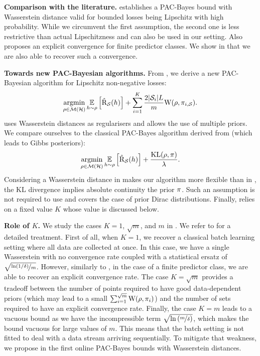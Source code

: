 \documentclass{article}
\begin{document}
\textbf{Comparison with the literature.} \cite[][Theorem 11]{amit2022integral} establishes a PAC-Bayes bound with Wasserstein distance valid for bounded losses being Lipschitz with high probability. While we circumvent the first assumption, the second one is less restrictive than actual Lipschitzness and can also be used in our setting. Also \cite[Theorem 12]{amit2022integral} proposes an explicit convergence for finite predictor classes. We show in  that we are also able to recover such a convergence. 

\textbf{Towards new PAC-Bayesian algorithms.} From , we derive a new PAC-Bayesian algorithm for Lipschitz non-negative losses:
\begin{equation}
    \label{eq:batch-alg}
    \argmin_{\Q\in\Mcal(\H)} \EE_{h\sim \Q}\left[\Riskhat_{\S}(h)\right] + \sum_{i=1}^{K} \frac{2|\S_i|L}{m} \W(\Q, \P_{i,\S}).
\end{equation}
 uses Wasserstein distances as regularisers and allows the use of multiple priors. 
We compare ourselves to the classical PAC-Bayes algorithm derived from \cite[][Theorem 1.2.6]{catoni2007pac} (which leads to Gibbs posteriors):
\begin{equation}
    \label{eq:catoni-alg}
    \argmin_{\Q\in\Mcal(\H)} \EE_{h\sim \Q}\left[\Riskhat_{\S}(h)\right] +  \frac{\operatorname{KL}(\Q,\P)}{\lambda}.
\end{equation}
Considering a Wasserstein distance in  makes our algorithm more flexible than in , the KL divergence implies absolute continuity \wrt the prior $\P$.
Such an assumption is not required to use  and covers the case of prior Dirac distributions.
Finally,  relies on a fixed value $K$ whose value is discussed below.

\textbf{Role of $K$.} 
We study the cases $K=1$, $\sqrt{m}$, and $m$ in . We refer to  for a detailed treatment.
First of all, when $K=1$, we recover a classical batch learning setting where all data are collected at once.
In this case, we have a single Wasserstein with no convergence rate coupled with a statistical ersatz of $\sqrt{\nicefrac{\ln(1/\delta)}{m}}$.
However, similarly to \cite[][Theorem 12]{amit2022integral}, in the case of a finite predictor class, we are able to recover an explicit convergence rate.
The case $K=\sqrt{m}$ provides a tradeoff between the number of points required to have good data-dependent priors (which may lead to a small $\sum_{i=1}^{\sqrt{m}}\W(\Q, \P_i)$) and the number of sets required to have an explicit convergence rate. 
Finally, the case $K=m$ leads to a vacuous bound as we have the incompressible term $\sqrt{\ln\left(\nicefrac{m}{\delta}\right)}$, which makes the bound vacuous for large values of $m$.
This means that the batch setting is not fitted to deal with a data stream arriving sequentially. To mitigate that weakness, we propose in  the first online PAC-Bayes bounds with Wasserstein distances.
\end{document}
